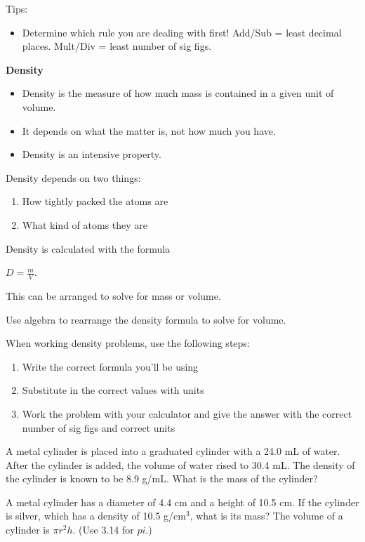\documentclass[../hchem.tex]{subfiles}
\begin{document}
Tips: 
\begin{itemize}
    \item Determine which rule you are dealing with first! Add/Sub = least decimal places. Mult/Div = least number of sig figs.
\end{itemize}

\textbf{Density}
\begin{itemize}
    \item Density is the measure of how much mass is contained in a given unit of volume.
    \item It depends on what the matter is, not how much you have.
    \item Density is an intensive property.
\end{itemize}

Density depends on two things:
\begin{enumerate}
    \item How tightly packed the atoms are 
    \item What kind of atoms they are 
\end{enumerate}

Density is calculated with the formula 
\begin{center}
    $D = \frac{m}{V}$.
    
    This can be arranged to solve for mass or volume.
\end{center}

\ex Use algebra to rearrange the density formula to solve for volume.

When working density problems, use the following steps:
\begin{enumerate}
    \item Write the correct formula you'll be using 
    \item Substitute in the correct values with units 
    \item Work the problem with your calculator and give the answer with the correct number of sig figs and correct units 
\end{enumerate}

\ex A metal cylinder is placed into a graduated cylinder with a 24.0 mL of water. After the cylinder is added, the volume of water rised to 30.4 mL. 
The density of the cylinder is known to be 8.9 g/mL. What is the mass of the cylinder?

\ex A metal cylinder has a diameter of 4.4 cm and a height of 10.5 cm. If the cylinder is silver, which has a density of 10.5 g/cm$^3$, what is its mass? The volume of a cylinder is $\pi r^2h$. (Use 3.14 for $pi$.)
\end{document}
